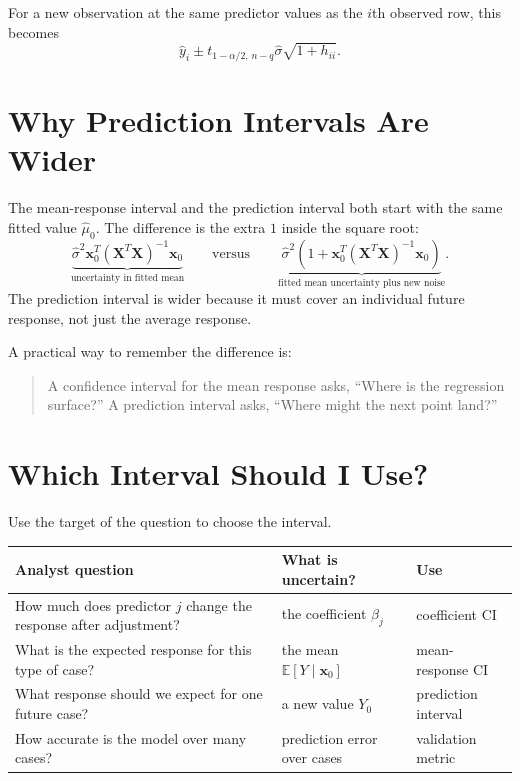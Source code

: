 For a new observation at the same predictor values as the \(i\)th observed row, this becomes
\begin{equation}
  \widehat{y}_i
  \pm
  t_{1-\alpha/2,\,n-q}\widehat{\sigma}\sqrt{1+h_{ii}}.
\end{equation}

\section{Why Prediction Intervals Are Wider}

The mean-response interval and the prediction interval both start with the same fitted value \(\widehat{\mu}_0\).  The difference is the extra \(1\) inside the square root:
\begin{equation}
  \underbrace{\widehat{\sigma}^2\mathbf{x}_0^T(\mathbf{X}^T\mathbf{X})^{-1}\mathbf{x}_0}_{\text{uncertainty in fitted mean} }
  \qquad\text{versus}\qquad
  \underbrace{\widehat{\sigma}^2\left(1+\mathbf{x}_0^T(\mathbf{X}^T\mathbf{X})^{-1}\mathbf{x}_0\right)}_{\text{fitted mean uncertainty plus new noise}}.
\end{equation}
The prediction interval is wider because it must cover an individual future response, not just the average response.

A practical way to remember the difference is:
\begin{quote}
  A confidence interval for the mean response asks, ``Where is the regression surface?''  A prediction interval asks, ``Where might the next point land?''
\end{quote}

\section{Which Interval Should I Use?}

Use the target of the question to choose the interval.

\begin{center}
\begin{tabular}{p{}p{}p{}}
\toprule
\textbf{Analyst question} & \textbf{What is uncertain?} & \textbf{Use} \\
\midrule
How much does predictor \(j\) change the response after adjustment? & the coefficient \(\beta_j\) & coefficient CI \\
What is the expected response for this type of case? & the mean \(\mathbb{E}[Y\mid\mathbf{x}_0]\) & mean-response CI \\
What response should we expect for one future case? & a new value \(Y_0\) & prediction interval \\
How accurate is the model over many cases? & prediction error over cases & validation metric \\
\bottomrule
\end{tabular}
\end{center}

